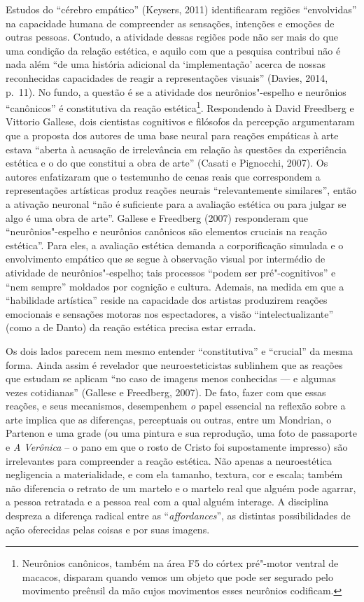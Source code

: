 Estudos do ``cérebro empático'' (Keysers, 2011) identificaram regiões
``envolvidas'' na capacidade humana de compreender as sensações,
intenções e emoções de outras pessoas. Contudo, a atividade dessas
regiões pode não ser mais do que uma condição da relação estética, e
aquilo com que a pesquisa contribui não é nada além ``de uma história
adicional da `implementação' acerca de nossas reconhecidas capacidades
de reagir a representações visuais'' (Davies, 2014, p.~11). No fundo, a
questão é se a atividade dos neurônios"-espelho e neurônios ``canônicos''
é constitutiva da reação estética\footnote[21]{Neurônios canônicos, também na área F5 do córtex pré"-motor ventral
de macacos, disparam quando vemos um objeto que pode ser segurado pelo
movimento preênsil da mão cujos movimentos esses neurônios codificam.}. Respondendo à
David Freedberg e Vittorio Gallese, dois cientistas cognitivos e
filósofos da percepção argumentaram que a proposta dos autores de uma
base neural para reações empáticas à arte estava ``aberta à acusação de
irrelevância em relação às questões da experiência estética e o do que
constitui a obra de arte'' (Casati e Pignocchi, 2007). Os autores
enfatizaram que o testemunho de cenas reais que correspondem a
representações artísticas produz reações neurais ``relevantemente
similares'', então a ativação neuronal ``não é suficiente para a
avaliação estética ou para julgar se algo é uma obra de arte''. Gallese
e Freedberg (2007) responderam que ``neurônios"-espelho e neurônios
canônicos são elementos cruciais na reação estética''. Para eles, a
avaliação estética demanda a corporificação simulada e o envolvimento
empático que se segue à observação visual por intermédio de atividade de
neurônios"-espelho; tais processos ``podem ser pré"-cognitivos'' e ``nem
sempre'' moldados por cognição e cultura. Ademais, na medida em que a
``habilidade artística'' reside na capacidade dos artistas produzirem
reações emocionais e sensações motoras nos espectadores, a visão
``intelectualizante'' (como a de Danto) da reação estética precisa estar
errada.

Os dois lados parecem nem mesmo entender ``constitutiva'' e ``crucial''
da mesma forma. Ainda assim é revelador que neuroesteticistas sublinhem
que as reações que estudam se aplicam ``no caso de imagens menos
conhecidas --- e algumas vezes cotidianas'' (Gallese e Freedberg, 2007).
De fato, fazer com que essas reações, e seus mecanismos, desempenhem
\emph{o} papel essencial na reflexão sobre a arte implica que as
diferenças, perceptuais ou outras, entre um Mondrian, o Partenon e uma
grade (ou uma pintura e sua reprodução, uma foto de passaporte e \emph{A
Verônica} -- o pano em que o rosto de Cristo foi supostamente impresso)
são irrelevantes para compreender a reação estética. Não apenas a
neuroestética negligencia a materialidade, e com ela tamanho, textura,
cor e escala; também não diferencia o retrato de um martelo e o martelo
real que alguém pode agarrar, a pessoa retratada e a pessoa real com a
qual alguém interage. A disciplina despreza a diferença radical entre as
``\emph{affordances}'', as distintas possibilidades de ação oferecidas
pelas coisas e por suas imagens.


